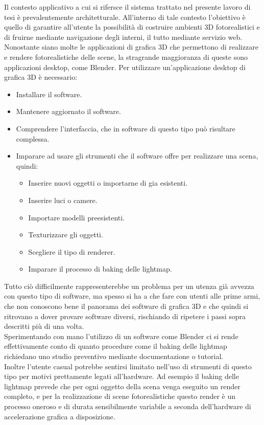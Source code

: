 Il contesto applicativo a cui si rifersce il sistema trattato nel presente lavoro di tesi è prevalentemente architetturale.
All’interno di tale contesto l’obiettivo è quello di garantire all’utente la possibilità di costruire ambienti 3D fotorealistici e di fruirne mediante navigazione degli interni, il tutto mediante servizio web. 
Nonostante siano molte le applicazioni di grafica 3D che permettono di realizzare e rendere fotorealistiche delle scene, la stragrande maggioranza di queste sono applicazioni desktop, come Blender.
Per utilizzare un’applicazione desktop di grafica 3D è necessario:
\begin{itemize}
\item Installare il software.
\item Mantenere aggiornato il software.
\item Comprendere l’interfaccia, che in software di questo tipo può risultare complessa.
\item Imparare ad usare gli strumenti che il software offre per realizzare una scena, quindi:
\begin{itemize}
\item Inserire nuovi oggetti o importarne di gia esistenti.
\item Inserire luci o camere.
\item Importare modelli preesistenti. 
\item Texturizzare gli oggetti.
\item Scegliere il tipo di renderer.
\item Imparare il processo di baking delle lightmap.
\end{itemize}
\end{itemize}
Tutto ciò difficilmente rappresenterebbe un problema per un utenza già avvezza con questo tipo di software, ma spesso si ha a che fare con utenti alle prime armi, che non conoscono bene il panorama dei software di grafica 3D e che quindi si ritrovano a dover provare software diversi, rischiando di ripetere i passi sopra descritti più di una volta. 
\\
Sperimentando con mano l’utilizzo di un software come Blender ci si rende effettivamente conto di quanto procedure come il baking delle lightmap richiedano uno studio preventivo mediante documentazione o tutorial. 
\\
Inoltre l’utente casual potrebbe sentirsi limitato nell’uso di strumenti di questo tipo per motivi prettamente legati all’hardware.
Ad esempio il baking delle lightmap prevede che per ogni oggetto della scena venga eseguito un render completo, e per la realizzazione di scene fotorealistiche questo render è un processo oneroso e di durata sensibilmente variabile a seconda dell’hardware di accelerazione grafica a disposizione. 
